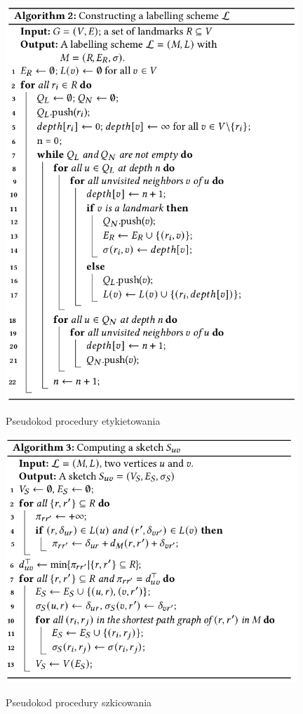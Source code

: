 \documentclass{article}
\theoremstyle{definition}
\begin{document}
    \begin{figure}[!tbh]
        \includegraphics[width=11cm]{img/algorithm_2.png}
        \centering
        \label{fig:alg2}
        \caption{Pseudokod procedury etykietowania}
    \end{figure}


    \begin{figure}[!tbh]
        \includegraphics[width=11cm]{img/algorithm_3.png}
        \centering
        \label{fig:alg3}
        \caption{Pseudokod procedury szkicowania}
    \end{figure}
\end{document}
